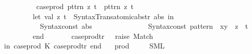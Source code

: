 \begin{isabellebody}
\ \ \ \ \ \ \ \ \ \ {\isacharparenleft}{\kern0pt}{\isacharasterisk}{\kern0pt}\ case{\isacharunderscore}{\kern0pt}prod\ {\isacharparenleft}{\kern0pt}{\isasymlambda}pttrn\ z{\isachardot}{\kern0pt}\ t{\isacharparenright}{\kern0pt}\ {\isasymRightarrow}\ {\isasymlambda}{\isacharparenleft}{\kern0pt}pttrn{\isacharcomma}{\kern0pt}\ z{\isacharparenright}{\kern0pt}{\isachardot}{\kern0pt}\ t\ {\isacharasterisk}{\kern0pt}{\isacharparenright}{\kern0pt}\isanewline
\ \ \ \ \ \ \ \ \ \ let\ val\ {\isacharparenleft}{\kern0pt}z{\isacharcomma}{\kern0pt}\ t{\isacharparenright}{\kern0pt}\ {\isacharequal}{\kern0pt}\ Syntax{\isacharunderscore}{\kern0pt}Trans{\isachardot}{\kern0pt}atomic{\isacharunderscore}{\kern0pt}abs{\isacharunderscore}{\kern0pt}tr{\isacharprime}{\kern0pt}\ abs\ in\isanewline
\ \ \ \ \ \ \ \ \ \ \ \ Syntax{\isachardot}{\kern0pt}const\ \isactrlsyntaxUNDERSCOREconst {\isasymopen}{\isacharunderscore}{\kern0pt}abs{\isasymclose}\ {\isachardollar}{\kern0pt}\isanewline
\ \ \ \ \ \ \ \ \ \ \ \ \ \ {\isacharparenleft}{\kern0pt}Syntax{\isachardot}{\kern0pt}const\ \isactrlsyntaxUNDERSCOREconst {\isasymopen}{\isacharunderscore}{\kern0pt}pattern{\isasymclose}\ {\isachardollar}{\kern0pt}\ x{\isacharunderscore}{\kern0pt}y\ {\isachardollar}{\kern0pt}\ z{\isacharparenright}{\kern0pt}\ {\isachardollar}{\kern0pt}\ t\isanewline
\ \ \ \ \ \ \ \ \ \ end\isanewline
\ \ \ \ \ \ {\isacharbar}{\kern0pt}\ case{\isacharunderscore}{\kern0pt}prod{\isacharunderscore}{\kern0pt}tr{\isacharprime}{\kern0pt}\ {\isacharunderscore}{\kern0pt}\ {\isacharequal}{\kern0pt}\ raise\ Match{\isacharsemicolon}{\kern0pt}\isanewline
\ \ in\ {\isacharbrackleft}{\kern0pt}{\isacharparenleft}{\kern0pt}\isactrlconstUNDERSCOREsyntax {\isasymopen}case{\isacharunderscore}{\kern0pt}prod{\isasymclose}{\isacharcomma}{\kern0pt}\ K\ case{\isacharunderscore}{\kern0pt}prod{\isacharunderscore}{\kern0pt}tr{\isacharprime}{\kern0pt}{\isacharparenright}{\kern0pt}{\isacharbrackright}{\kern0pt}\ end\isanewline
{\isacartoucheclose}%
\endisatagML
{\isafoldML}%
%
\isadelimML
%
\endisadelimML
%
\isadelimdocument
%
\endisadelimdocument
%
\isatagdocument
%
\isamarkuptrue%
%
\endisatagdocument
{\isafolddocument}%
%
\isadelimdocument
%
\endisadelimdocument
{}\isamarkupfalse%
\isanewline
\ \ \ prod\ {\isasymrightharpoonup}\isanewline
\ \ \ \ {\isacharparenleft}{\kern0pt}SML{\isacharparenright}{\kern0pt}\ \ {}\ {\isachardoublequoteopen}{\isacharasterisk}{\kern0pt}{\isachardoublequoteclose}\isanewline

\end{isabellebody}
